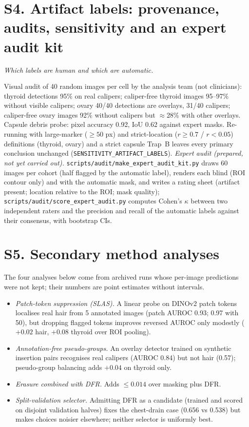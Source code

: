 \documentclass[review,3p]{elsarticle}
\begin{document}
\section*{S4. Artifact labels: provenance, audits, sensitivity and an expert audit kit}\label{supp:S4}
\emph{Which labels are human and which are automatic.}

Visual audit of 40 random images per cell by the analysis team (not clinicians): thyroid detections 95\% on real
calipers; caliper-free thyroid images 95--97\% without visible calipers; ovary 40/40 detections are overlays, 31/40
calipers; caliper-free ovary images 92\% without calipers but $\approx$28\% with other overlays. Capsule debris probe:
pixel accuracy 0.92, IoU 0.62 against expert masks. Re-running with large-marker ($\ge50$ px) and strict-location
($r\ge0.7$ / $r<0.05$) definitions (thyroid, ovary) and a strict capsule Trap~B leaves every primary conclusion
unchanged (\texttt{SENSITIVITY\_ARTIFACT\_LABELS}). \emph{Expert audit (prepared, not yet carried out).}
\texttt{scripts/audit/make\_expert\_audit\_kit.py} draws 60 images per cohort (half flagged by the automatic label),
renders each blind (ROI contour only) and with the automatic mask, and writes a rating sheet (artifact present;
location relative to the ROI; mask quality); \texttt{scripts/audit/score\_expert\_audit.py} computes Cohen's
$\kappa$ between two independent raters and the precision and recall of the automatic labels against their
consensus, with bootstrap CIs.

\section*{S5. Secondary method analyses}\label{supp:S5}
The four analyses below come from archived runs whose per-image predictions were not kept; their numbers are point
estimates without intervals.
\begin{itemize}
\item \emph{Patch-token suppression (SLAS).} A linear probe on DINOv2 patch tokens localises real hair from 5
annotated images (patch AUROC 0.93; 0.97 with 50), but dropping flagged tokens improves reversed AUROC only
modestly ($+0.02$ hair, $+0.08$ thyroid over ROI pooling).
\item \emph{Annotation-free pseudo-groups.} An overlay detector trained on synthetic insertion pairs recognises real
calipers (AUROC 0.84) but not hair (0.57); pseudo-group balancing adds $+0.04$ on thyroid only.
\item \emph{Erasure combined with DFR.} Adds $\le0.014$ over masking plus DFR.
\item \emph{Split-validation selector.} Admitting DFR as a candidate (trained and scored on disjoint validation
halves) fixes the chest-drain case (0.656 vs 0.538) but makes choices noisier elsewhere; neither selector is
uniformly best.
\end{itemize}
\end{document}
